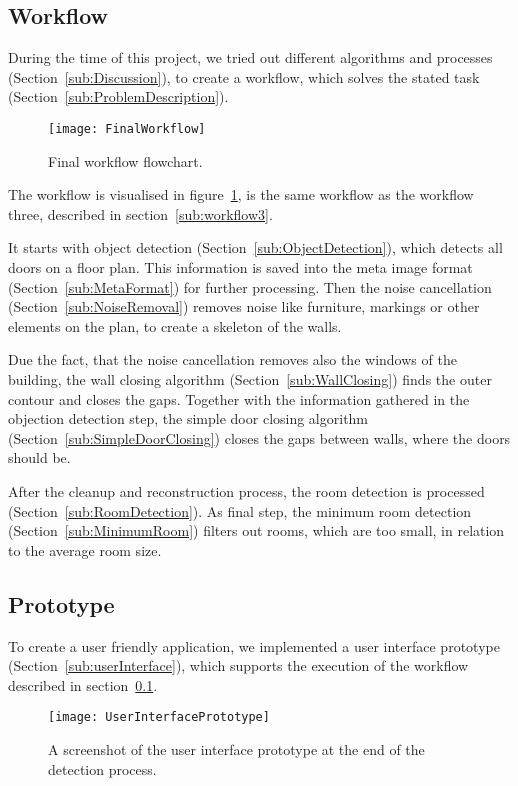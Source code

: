 \subsection{Workflow}
\label{sub:FinalWorkflow}
During the time of this project, we tried out different algorithms and processes (Section~\ref{sub:Discussion}), to create a workflow, which solves the stated task (Section~\ref{sub:ProblemDescription}).

\begin{figure}[H]
	\centering
	\texttt{[image: FinalWorkflow]}
	\caption{Final workflow flowchart.}
	\label{fig:FinalWorkflow}
\end{figure}

The workflow is visualised in figure~\ref{fig:FinalWorkflow}, is the same workflow as the workflow three, described in section~\ref{sub:workflow3}.

It starts with object detection (Section~\ref{sub:ObjectDetection}), which detects all doors on a floor plan. This information is saved into the meta image format (Section~\ref{sub:MetaFormat}) for further processing. Then the noise cancellation (Section~\ref{sub:NoiseRemoval}) removes noise like furniture, markings or other elements on the plan, to create a skeleton of the walls.

Due the fact, that the noise cancellation removes also the windows of the building, the wall closing algorithm (Section~\ref{sub:WallClosing}) finds the outer contour and closes the gaps. Together with the information gathered in the objection detection step, the simple door closing algorithm (Section~\ref{sub:SimpleDoorClosing}) closes the gaps between walls, where the doors should be.

After the cleanup and reconstruction process, the room detection is processed (Section~\ref{sub:RoomDetection}). As final step, the minimum room detection (Section~\ref{sub:MinimumRoom}) filters out rooms, which are too small, in relation to the average room size.


\subsection{Prototype}
To create a user friendly application, we implemented a user interface prototype (Section~\ref{sub:userInterface}), which supports the execution of the workflow described in section~\ref{sub:FinalWorkflow}.

\begin{figure}[H]
	\centering
	\texttt{[image: UserInterfacePrototype]}
	\caption{A screenshot of the user interface prototype at the end of the detection process.}
	\label{fig:UserInterfacePrototype}
\end{figure}

